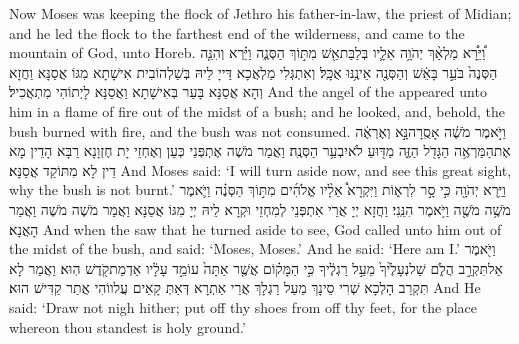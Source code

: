 {Now Moses was keeping the flock of Jethro his father-in-law, the priest of Midian; and he led the flock to the farthest end of the wilderness, and came to the mountain of God, unto Horeb.}{}
{וַ֠יֵּרָ֠א מַלְאַ֨ךְ יְהֹוָ֥ה אֵלָ֛יו בְּלַבַּת\maqqaf אֵ֖שׁ מִתּ֣וֹךְ הַסְּנֶ֑ה וַיַּ֗רְא וְהִנֵּ֤ה הַסְּנֶה֙ בֹּעֵ֣ר בָּאֵ֔שׁ וְהַסְּנֶ֖ה אֵינֶ֥נּוּ אֻכָּֽל׃}
{וְאִתְגְּלִי מַלְאֲכָא דַּייָ לֵיהּ בְּשַׁלְהוֹבִית אִישָׁתָא מִגּוֹ אֲסַנָּא וַחֲזָא וְהָא אֲסַנָּא בָּעַר בְּאִישָׁתָא וַאֲסַנָּא לָיְתוֹהִי מִתְאֲכִיל׃}
{And the angel of the \lord\space appeared unto him in a flame of fire out of the midst of a bush; and he looked, and, behold, the bush burned with fire, and the bush was not consumed.}{}
{וַיֹּ֣אמֶר מֹשֶׁ֔ה אָסֻֽרָה\maqqaf נָּ֣א וְאֶרְאֶ֔ה אֶת\maqqaf הַמַּרְאֶ֥ה הַגָּדֹ֖ל הַזֶּ֑ה מַדּ֖וּעַ לֹא\maqqaf יִבְעַ֥ר הַסְּנֶֽה׃}
{וַאֲמַר מֹשֶׁה אֶתְפְּנֵי כְּעַן וְאֶחְזֵי יָת חֶזְוָנָא רַבָּא הָדֵין מָא דֵין לָא מִתּוֹקַד אֲסַנָּא׃}
{And Moses said: ‘I will turn aside now, and see this great sight, why the bush is not burnt.’}{}
{וַיַּ֥רְא יְהֹוָ֖ה כִּ֣י סָ֣ר לִרְא֑וֹת וַיִּקְרָא֩ אֵלָ֨יו אֱלֹהִ֜ים מִתּ֣וֹךְ הַסְּנֶ֗ה וַיֹּ֛אמֶר מֹשֶׁ֥ה מֹשֶׁ֖ה וַיֹּ֥אמֶר הִנֵּֽנִי׃}
{וַחֲזָא יְיָ אֲרֵי אִתְפְּנֵי לְמִחְזֵי וּקְרָא לֵיהּ יְיָ מִגּוֹ אֲסַנָּא וַאֲמַר מֹשֶׁה מֹשֶׁה וַאֲמַר הָאֲנָא׃}
{And when the \lord\space saw that he turned aside to see, God called unto him out of the midst of the bush, and said: ‘Moses, Moses.’ And he said: ‘Here am I.’}{}
{וַיֹּ֖אמֶר אַל\maqqaf תִּקְרַ֣ב הֲלֹ֑ם שַׁל\maqqaf נְעָלֶ֙יךָ֙ מֵעַ֣ל רַגְלֶ֔יךָ כִּ֣י הַמָּק֗וֹם אֲשֶׁ֤ר אַתָּה֙ עוֹמֵ֣ד עָלָ֔יו אַדְמַת\maqqaf קֹ֖דֶשׁ הֽוּא׃}
{וַאֲמַר לָא תִּקְרַב הָלְכָא שְׁרִי סֵינָךְ מֵעַל רַגְלָךְ אֲרֵי אַתְרָא דְּאַתְּ קָאֵים עֲלווֹהִי אֲתַר קַדִּישׁ הוּא׃}
{And He said: ‘Draw not nigh hither; put off thy shoes from off thy feet, for the place whereon thou standest is holy ground.’}{}
